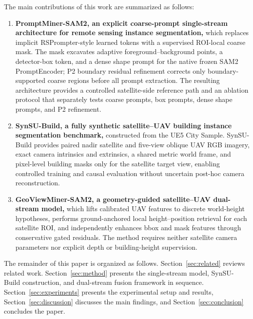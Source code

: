 \documentclass[letterpaper,journal]{IEEEtran}
\begin{document}
The main contributions of this work are summarized as follows:
\begin{enumerate}
\item \textbf{PromptMiner-SAM2, an explicit coarse-prompt single-stream architecture for remote sensing instance segmentation,} which replaces implicit RSPrompter-style learned tokens with a supervised ROI-local coarse mask. The mask excavates adaptive foreground--background points, a detector-box token, and a dense shape prompt for the native frozen SAM2 PromptEncoder; P2 boundary residual refinement corrects only boundary-supported coarse regions before all prompt extraction. The resulting architecture provides a controlled satellite-side reference path and an ablation protocol that separately tests coarse prompts, box prompts, dense shape prompts, and P2 refinement.

\item \textbf{SynSU-Build, a fully synthetic satellite--UAV building instance segmentation benchmark,} constructed from the UE5 City Sample. SynSU-Build provides paired nadir satellite and five-view oblique UAV RGB imagery, exact camera intrinsics and extrinsics, a shared metric world frame, and pixel-level building masks only for the satellite target view, enabling controlled training and causal evaluation without uncertain post-hoc camera reconstruction.

\item \textbf{GeoViewMiner-SAM2, a geometry-guided satellite--UAV dual-stream model,} which lifts calibrated UAV features to discrete world-height hypotheses, performs ground-anchored local height--position retrieval for each satellite ROI, and independently enhances bbox and mask features through conservative gated residuals. The method requires neither satellite camera parameters nor explicit depth or building-height supervision.
\end{enumerate}

The remainder of this paper is organized as follows. Section~\ref{sec:related} reviews related work. Section~\ref{sec:method} presents the single-stream model, SynSU-Build construction, and dual-stream fusion framework in sequence. Section~\ref{sec:experiments} presents the experimental setup and results, Section~\ref{sec:discussion} discusses the main findings, and Section~\ref{sec:conclusion} concludes the paper.

\clearpage

\end{document}
